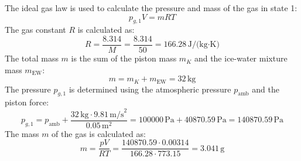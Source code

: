 The ideal gas law is used to calculate the pressure and mass of the gas in state 1:  
\[
p_{g,1} V = mRT
\]  
The gas constant \( R \) is calculated as:  
\[
R = \frac{8.314}{M} = \frac{8.314}{50} = 166.28 \, \text{J/(kg·K)}
\]  
The total mass \( m \) is the sum of the piston mass \( m_K \) and the ice-water mixture mass \( m_{\text{EW}} \):  
\[
m = m_K + m_{\text{EW}} = 32 \, \text{kg}
\]  
The pressure \( p_{g,1} \) is determined using the atmospheric pressure \( p_{\text{amb}} \) and the piston force:  
\[
p_{g,1} = p_{\text{amb}} + \frac{32 \, \text{kg} \cdot 9.81 \, \text{m/s}^2}{0.05 \, \text{m}^2} = 100000 \, \text{Pa} + 40870.59 \, \text{Pa} = 140870.59 \, \text{Pa}
\]  
The mass \( m \) of the gas is calculated as:  
\[
m = \frac{p V}{RT} = \frac{140870.59 \cdot 0.00314}{166.28 \cdot 773.15} = 3.041 \, \text{g}
\]
